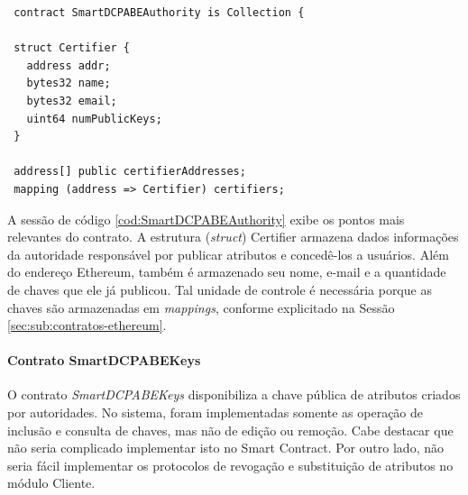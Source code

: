 \documentclass[a4paper,11pt]{article}
\begin{document}
\begin{lstlisting}
 contract SmartDCPABEAuthority is Collection {

 struct Certifier {
   address addr;
   bytes32 name;
   bytes32 email;
   uint64 numPublicKeys;
 }

 address[] public certifierAddresses;
 mapping (address => Certifier) certifiers;
\end{lstlisting} %


A sessão de código \ref{cod:SmartDCPABEAuthority} exibe os pontos mais relevantes do contrato.
A estrutura (\textit{struct}) Certifier armazena dados informações da autoridade responsável por publicar atributos e concedê-los a usuários.
Além do endereço Ethereum, também é armazenado seu nome, e-mail e a quantidade de chaves que ele já publicou.
Tal unidade de controle é necessária porque as chaves são armazenadas em \emph{mappings}, conforme explicitado na Sessão \ref{sec:sub:contratos-ethereum}.

\paragraph{Contrato SmartDCPABEKeys}



O contrato \emph{SmartDCPABEKeys} disponibiliza a chave pública de atributos criados por autoridades.
No sistema, foram implementadas somente as operação de inclusão e consulta de chaves, mas não de edição ou remoção.
Cabe destacar que não seria complicado implementar isto no Smart Contract.
Por outro lado, não seria fácil implementar os protocolos de revogação e substituição de atributos no módulo Cliente.%
\end{document}
